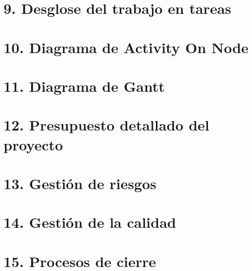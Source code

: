 \documentclass[
11pt, %
codirector, %
]{charter}
\begin{document}
\section{9. Desglose del trabajo en tareas}
\label{sec:wbs}


\newpage
\section{10. Diagrama de Activity On Node}
\label{sec:AoN}



\section{11. Diagrama de Gantt}
\label{sec:gantt}


\section{12. Presupuesto detallado del proyecto}
\label{sec:presupuesto}



\section{13. Gestión de riesgos}
\label{sec:riesgos}


\section{14. Gestión de la calidad}
\label{sec:calidad}


\section{15. Procesos de cierre}    
\label{sec:cierre}

\end{document}

